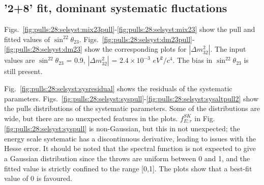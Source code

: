 \clearpage
\subsection{'2+8' fit, dominant systematic fluctations}

Figs.\ \ref{fig:pulls:28:selsyst:mix23pull}-\ref{fig:pulls:28:selsyst:mix23} show the pull and fitted values of
$\sin^22\theta_{23}$.
Figs.\ \ref{fig:pulls:28:selsyst:dm23pull}-\ref{fig:pulls:28:selsyst:dm23} show the corresponding plots for 
$|\Delta m^2_{32}|$.
The input values are $\sin^22\theta_{23}$ = 0.9, $|\Delta m^2_{32}|$ = $2.4 \times 10^{-3}$ $eV^2/c^4$.
The bias in $\sin^22\theta_{23}$ is still present.

Fig.\ \ref{fig:pulls:28:selsyst:sysresidual} shows the residuals of the systematic parameters.
Figs.\ \ref{fig:pulls:28:selsyst:syspull}-\ref{fig:pulls:28:selsyst:sysaltpull2} show the pulls distributions of the systematic parameters.
Some of the distributions are wide, but there are no unexpected features in the plots.
$f_{E; r}^{SK}$ in Fig. \ref{fig:pulls:28:selsyst:syspull} is non-Gaussian, but this in not unexpected;
the energy scale systematic has a discontinuous derivative, leading to issues with the Hesse error.
It should be noted that the spectral function is not expected to give a Gaussian distribution
since the throws are uniform between 0 and 1, and the fitted value is strictly confined to the range [0,1].
The plots show that a best-fit value of 0 is favoured.

